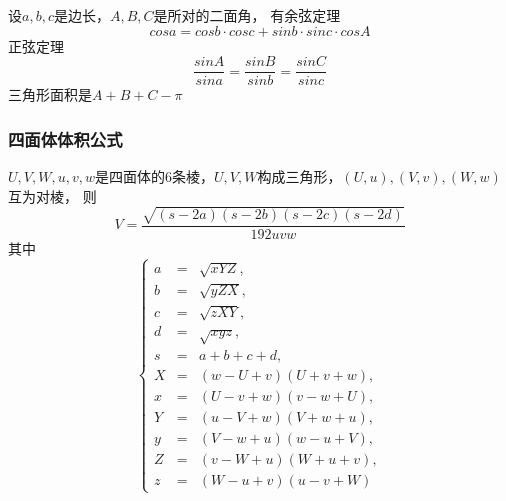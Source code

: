 \documentclass[a4paper]{article}
\begin{document}
设$a, b, c$是边长，$A, B, C$是所对的二面角，
有余弦定理$$cos a = cos b \cdot cos c + sin b \cdot sin c \cdot cos A$$
正弦定理$$\frac{sin A}{sin a} = \frac{sin B}{sin b} = \frac{sin C}{sin c}$$
三角形面积是$A + B + C - \pi$

\subsubsection{四面体体积公式}

$U, V, W, u, v, w$是四面体的$6$条棱，$U, V, W$构成三角形，$(U, u), (V, v), (W, w)$互为对棱，
则$$V = \frac{\sqrt{(s - 2a)(s - 2b)(s - 2c)(s - 2d)}}{192 uvw}$$
其中$$\left\{\begin{array}{lll}
a & = & \sqrt{xYZ}, \\
b & = & \sqrt{yZX}, \\
c & = & \sqrt{zXY}, \\
d & = & \sqrt{xyz}, \\
s & = & a + b + c + d, \\ 
X & = & (w - U + v)(U + v + w), \\
x & = & (U - v + w)(v - w + U), \\
Y & = & (u - V + w)(V + w + u), \\
y & = & (V - w + u)(w - u + V), \\
Z & = & (v - W + u)(W + u + v), \\
z & = & (W - u + v)(u - v + W)
\end{array}\right.$$


\end{document}
